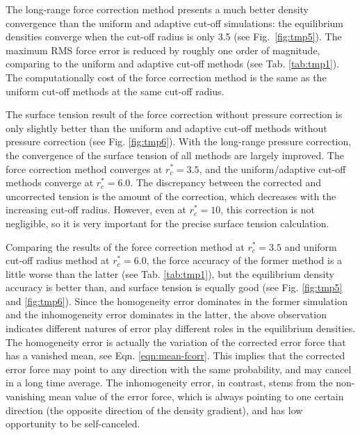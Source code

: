 \documentclass[aps,pre,preprint]{revtex4-1}
\begin{document}
The long-range force correction method presents a much better density
convergence than the uniform and adaptive cut-off simulations: the
equilibrium densities converge when the cut-off radius is only 3.5
(see Fig.~\ref{fig:tmp5}). The maximum RMS force error is reduced by roughly
one order of magnitude, comparing to the uniform and adaptive cut-off
methods (see Tab. \ref{tab:tmp1}). The computationally cost of the
force correction method is the same as the uniform cut-off methods at
the same cut-off radius. 



The surface tension result of the force correction without pressure
correction is only slightly better than the uniform and adaptive
cut-off methods without pressure correction (see Fig. \ref{fig:tmp6}).
With the long-range pressure correction, the convergence of the
surface tension of all methods are largely improved.  The force
correction method converges at $r_c^\ast = 3.5$, and the
uniform/adaptive cut-off methods converge at $r_c^\ast = 6.0$.  The
discrepancy between the corrected and uncorrected tension is the
amount of the correction, which decreases with the increasing cut-off
radius. However, even at $r_c^\ast=10$, this correction is not
negligible, so it is very important for the precise surface tension
calculation.

Comparing the results of the force correction method at $r_c^\ast =
3.5$ and uniform cut-off radius method at $r_c^\ast = 6.0$, the force
accuracy of the former method is a little worse than the latter (see
Tab. \ref{tab:tmp1}), but the equilibrium density accuracy is better than,
and surface tension is equally good (see
Fig. \ref{fig:tmp5} and \ref{fig:tmp6}).
Since the homogeneity error dominates in the former simulation and the
inhomogeneity error dominates in the latter, the above observation
indicates different natures of error play different roles in the
equilibrium densities.  The homogeneity error is actually the variation of the
corrected error force that has a vanished mean, see
Eqn. \eqref{eqn:mean-fcorr}. This implies that the corrected error
force may point to any direction with the same probability, and may cancel
in a long time average.  The inhomogeneity error,
in contrast, stems from the non-vanishing mean value of the error
force, which is always pointing to one certain direction (the opposite
direction of the density gradient), and has low  opportunity to be
self-canceled.
\end{document}
